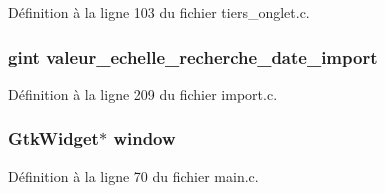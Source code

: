 Définition à la ligne 103 du fichier tiers\_\-onglet.c.

\subsubsection[{valeur\_\-echelle\_\-recherche\_\-date\_\-import}]{\setlength{\rightskip}{0pt plus 5cm}gint {\bf valeur\_\-echelle\_\-recherche\_\-date\_\-import}}\label{import_8c_abd82865835fd6c5fcfe97283dbfd0648}


Définition à la ligne 209 du fichier import.c.

\subsubsection[{window}]{\setlength{\rightskip}{0pt plus 5cm}GtkWidget$\ast$ {\bf window}}\label{import_8c_a3d346c08cf2d67c388caabffb412b293}


Définition à la ligne 70 du fichier main.c.

